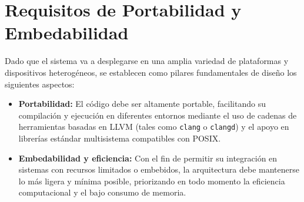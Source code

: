 \documentclass{article}
\begin{document}
\section{Requisitos de Portabilidad y Embedabilidad}\label{sec:portability}

Dado que el sistema va a desplegarse en una amplia variedad de plataformas y
dispositivos heterogéneos, se establecen como pilares fundamentales de diseño
los siguientes aspectos:

\begin{itemize}
        \item \textbf{Portabilidad:} El código debe ser altamente portable,
              facilitando su compilación y ejecución en diferentes entornos
              mediante el uso de cadenas de herramientas basadas en LLVM
              (tales como \texttt{clang} o \texttt{clangd}) y el apoyo en
              librerías estándar multisistema compatibles con POSIX.
        \item \textbf{Embedabilidad y eficiencia:} Con el fin de permitir su
              integración en sistemas con recursos limitados o embebidos,
              la arquitectura debe mantenerse lo más ligera y mínima posible,
              priorizando en todo momento la eficiencia computacional y el bajo
              consumo de memoria.
\end{itemize}
\end{document}
